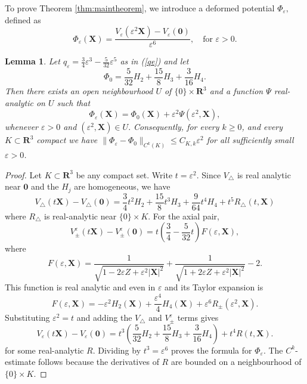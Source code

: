 \documentclass[12pt,a4paper]{article}
\theoremstyle{plain}
\newtheorem{lem}{Lemma}
\theoremstyle{definition}
\newcommand{\R}{\mathbf{R}}
\begin{document}
	
	To prove Theorem \ref{thm:maintheorem}, we introduce a deformed potential $\Phi_{\varepsilon},$ defined as
	\[
	\Phi_\varepsilon(\mathbf{X})=\frac{V_\varepsilon(\varepsilon^2\mathbf{X})-V_\varepsilon(\mathbf{0})}{\varepsilon^6},\quad\text{for }\varepsilon>0.
	\]
	\begin{lem}\label{lem:convergence}
		Let $q_{\varepsilon} = \frac{3}{4} \varepsilon^3 - \frac{5}{32} \varepsilon^5$ as in (\ref{qe}) and let
		\[
		\Phi_0 = \frac{5}{32} H_2+\frac{15}{8}H_3+\frac{3}{16}H_4.
		\]
		Then there exists an open neighbourhood $U$ of $\{ 0 \} \times \R^3$ and a function $\Psi$ real-analytic on $U$ such that
		\[
		\Phi_\varepsilon(\mathbf X) = \Phi_0(\mathbf X)+\varepsilon^2\Psi(\varepsilon^2,\mathbf X),
		\]
		whenever $\varepsilon>0$ and $(\varepsilon^2,\mathbf X)\in U.$ Consequently, for every $k\geq0$, and every $K \subset \R^3$ compact we have $\lVert \Phi_\varepsilon-\Phi_0 \rVert_{C^k(K)} \leq C_{K,k}\varepsilon^2$ for all sufficiently small \(\varepsilon>0\).
	\end{lem}
	
	\begin{proof}
		Let $K \subset \R^3$ be any compact set. Write $t = \varepsilon^2.$ Since $V_{\triangle}$ is real analytic near $\mathbf{0}$ and the $H_j$ are homogeneous, we have
		\[
		V_{\triangle}(t \mathbf X) - V_{\triangle}(\mathbf 0) = \frac{3}{4} t^2 H_2 + \frac{15} {8} t^3 H_3 + \frac{9}{64} t^4 H_4 + t^5 R_{\triangle} (t,\mathbf X)
		\]
		where $R_{\triangle}$ is real-analytic near $\{ 0 \} \times K.$ For the axial pair, 
		\[
		V^{\varepsilon}_{\pm}(t \mathbf X) - V^{\varepsilon}_{\pm}(\mathbf 0) = t \left(\frac{3}{4}-\frac{5}{32} t \right) F (\varepsilon,\mathbf X),
		\]
		where
		\[
		F(\varepsilon,\mathbf X)
		=
		\frac1{\sqrt{1-2\varepsilon Z+\varepsilon^2|\mathbf X|^2}}
		+
		\frac1{\sqrt{1+2\varepsilon Z+\varepsilon^2|\mathbf X|^2}}
		-2.
		\]
		This function is real analytic and even in $\varepsilon$ and its Taylor expansion is
		\[
		F(\varepsilon,\mathbf X)
		=
		-\varepsilon^2H_2(\mathbf X)
		+\frac{\varepsilon^4}{4}H_4(\mathbf X)
		+\varepsilon^6R_{\pm}(\varepsilon^2,\mathbf X).
		\]
		Substituting $\varepsilon^2=t$ and adding the $V_\triangle$ and $V^{\varepsilon}_{\pm}$ terms gives
		\[
		V_{\varepsilon}(t \mathbf X) - V_{\varepsilon}(\mathbf 0) = t^3 \left( \frac{5}{32} H_2 + \frac{15}{8} H_3 + \frac{3}{16} H_4 \right) + t^4 R (t,\mathbf X).
		\]
		for some real-analytic $R.$ Dividing by $t^3=\varepsilon^6$ proves the formula for $\Phi_{\varepsilon}$. The $C^k$-estimate follows because the derivatives of $R$ are bounded on a neighbourhood of $\{0\}\times K$.
	\end{proof}
	
\end{document}

